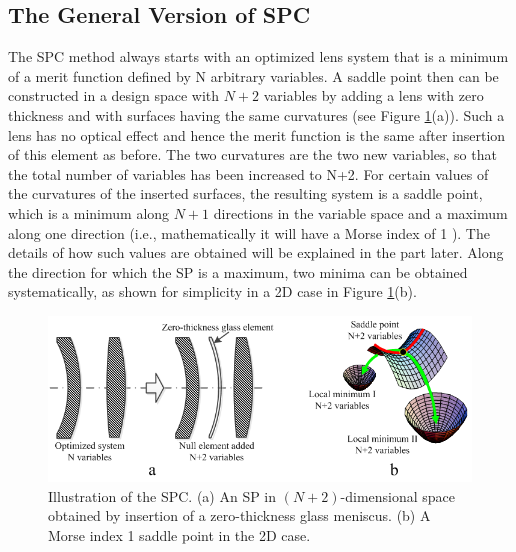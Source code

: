 \subsection{The General Version of SPC \label{spc-general}}
\label{SPC_general}
The SPC method always starts with an optimized lens system that is a minimum of a merit function defined by N arbitrary variables. A saddle point then can be constructed in a design space with $N + 2$ variables by adding a lens with zero thickness and with surfaces having the same curvatures (see Figure \ref{fig:SPCdemo}(a)). Such a lens has no optical effect and hence the merit function is the same after insertion of this element as before. The two curvatures are the two new variables, so that the total number of variables has been increased to N+2. For certain values of the curvatures of the inserted surfaces, the resulting system is a saddle point, which is a minimum along $N + 1$ directions in the variable space and a maximum along one direction (i.e., mathematically it will have a Morse index of 1 \cite{MVTurnhoutSPC15}). The details of how such values are obtained will be explained in the part later. Along the direction for which the SP is a maximum, two minima can be obtained systematically, as shown for simplicity in a 2D case in Figure \ref{fig:SPCdemo}(b).

\begin{figure}[h!]
    \centering
    \includegraphics[scale=0.68]{chapter-2/figures/FigSPCDemo.png}
    \caption{Illustration of the SPC. (a) An SP in $(N+2)$-dimensional space obtained by insertion of a zero-thickness glass meniscus. (b) A Morse index 1 saddle point in the 2D case.}
    \label{fig:SPCdemo}
\end{figure}

